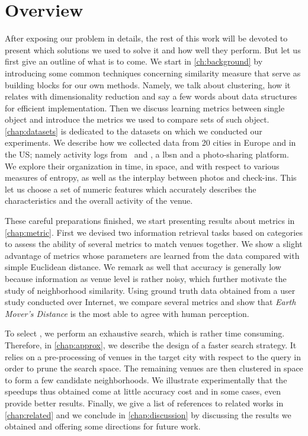 \section{Overview}
\label{sec:overview}

After exposing our problem in details, the rest of this work will be devoted to
present which solutions we used to solve it and how well they perform. But let
us first give an outline of what is to come. We start in
\autoref{ch:background} by introducing some common techniques concerning
similarity measure that serve as building blocks for our own methods.  Namely,
we talk about clustering, how it relates with dimensionality reduction and say
a few words about data structures for efficient implementation. Then we discuss
learning metrics between single object and introduce the metrics we used to
compare sets of such object. \autoref{chap:datasets} is dedicated to the
datasets on which we conducted our experiments. We describe how we collected
data from 20 cities in Europe and in the US; namely activity logs from \fs\ and
\flickr, a \gls{lbsn} and a photo-sharing platform. We explore their
organization in time, in space, and with respect to various measures of
entropy, as well as the interplay between photos and check-ins. This let us
choose a set of numeric features which accurately describes the characteristics
and the overall activity of the venue.

These careful preparations finished, we start presenting results about
metrics in \autoref{chap:metric}. First we devised two information retrieval
tasks based on \fs{} categories to assess the ability of several metrics to match
venues together. We show a slight advantage of metrics whose parameters
are learned from the data compared with simple Euclidean distance. We remark
as well that accuracy is generally low because information as venue level is
rather noisy, which further motivate the study of neighborhood similarity.
Using ground truth data obtained from a user study conducted over Internet, we
compare several metrics and show that \emph{Earth Mover's Distance} is the
most able to agree with human perception.

To select \emd{}, we perform an exhaustive search, which is rather time
consuming. Therefore, in \autoref{chap:approx}, we describe the design of a
faster search strategy. It relies on a pre-processing of venues in the target
city with respect to the query in order to prune the search space. The
remaining venues are then clustered in space to form a few candidate
neighborhoods. We illustrate experimentally that the speedups thus obtained
come at little accuracy cost and in some cases, even provide better results.
Finally, we give a list of references to related works in
\autoref{chap:related} and we conclude in \autoref{chap:discussion} by
discussing the results we obtained and offering some directions for future
work.

